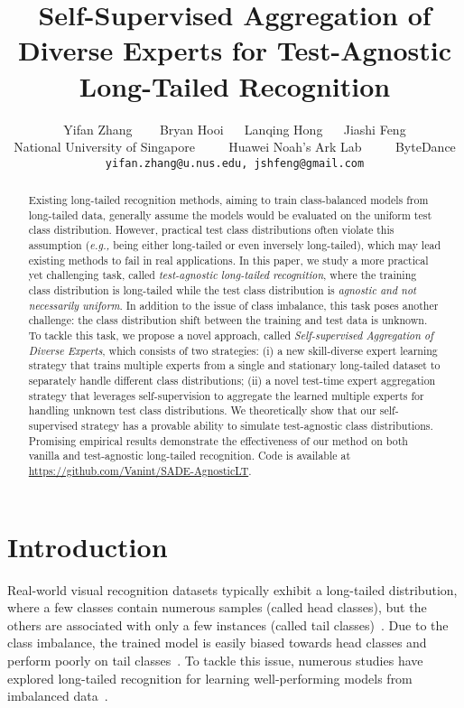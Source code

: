 \documentclass{article}
\title{Self-Supervised Aggregation of Diverse Experts  for Test-Agnostic Long-Tailed Recognition}
\author{Yifan Zhang ~~~  Bryan Hooi ~~ Lanqing Hong  ~~ Jiashi Feng \\ 
  National University of Singapore ~~~~ Huawei Noah’s Ark Lab ~~~~  ByteDance \\
  \texttt{yifan.zhang@u.nus.edu, jshfeng@gmail.com} 
}
\def\eg{\emph{e.g.}} \def\Eg{\emph{E.g.}}
\def\eg{\emph{e.g., }}
\begin{document}
 

\maketitle 

\begin{abstract} 
Existing long-tailed recognition methods, aiming to train class-balanced models from long-tailed data, generally assume the models would be evaluated on the uniform test class distribution. However, practical test class distributions often violate this assumption (\eg being either long-tailed or even inversely long-tailed), which may lead existing methods to fail in real applications. In this paper, we study a more practical yet challenging task, called \emph{test-agnostic long-tailed recognition}, where the training class distribution is long-tailed while the test class distribution is \emph{agnostic and not necessarily uniform}. In addition to the issue of class imbalance, this task poses another challenge: the class distribution shift between the training and test data is unknown. To tackle this task, we propose a novel approach, called \emph{Self-supervised Aggregation of Diverse Experts}, which consists of two strategies: (i) a new skill-diverse expert learning strategy that trains multiple experts from a single and stationary long-tailed dataset to separately handle different class distributions; (ii) a novel test-time expert aggregation strategy that leverages self-supervision to aggregate the learned multiple experts for handling unknown test class distributions. We theoretically show that our self-supervised strategy has a provable ability to simulate test-agnostic class distributions. Promising empirical results demonstrate the effectiveness of our method on both vanilla and test-agnostic long-tailed recognition. Code is available at  \url{https://github.com/Vanint/SADE-AgnosticLT}.

 
\end{abstract}     
  
\section{Introduction}  
Real-world  visual recognition datasets typically exhibit a long-tailed distribution, where a few classes contain numerous samples (called head classes), but the others are associated with only a few instances (called tail classes)~\cite{kang2021exploring,menon2020long}. Due to  the class imbalance,   the trained  model is easily biased towards   head   classes and perform poorly on tail  classes~\cite{cai2021ace,zhang2021deep}. To tackle this issue, numerous   studies have   explored  long-tailed recognition for learning well-performing models from imbalanced data~\cite{jamal2020rethinking,zhang2021distribution}.
\end{document}

